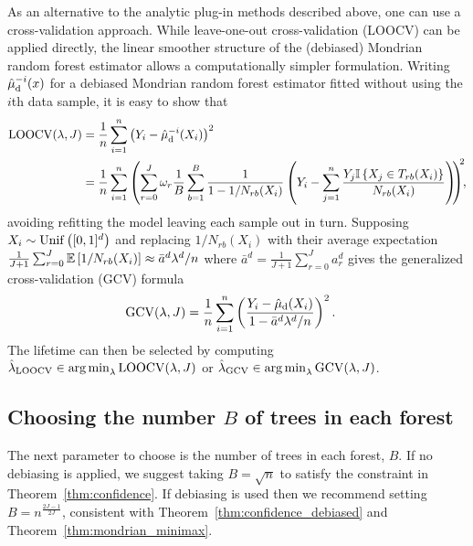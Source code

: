 As an alternative to the analytic plug-in methods described above,
one can use a cross-validation approach.
While leave-one-out cross-validation (LOOCV) can be applied directly,
the linear smoother structure of the (debiased) Mondrian random forest
estimator allows a computationally simpler formulation.
Writing $\hat\mu_{\mathrm{d}}^{-i}(x)$ for a debiased Mondrian random
forest estimator fitted without using the $i$th data sample,
it is easy to show that
%
\begin{align*}
  \operatorname{LOOCV}(\lambda, J)
  &=
  \frac{1}{n}
  \sum_{i=1}^{n}
  \left( Y_i - \hat\mu_{\mathrm{d}}^{-i}(X_i) \right)^2 \\
  &=
  \frac{1}{n}
  \sum_{i=1}^{n}
  \left(
    \sum_{r=0}^{J}
    \omega_r
    \frac{1}{B}
    \sum_{b=1}^{B}
    \frac{1}{1 - 1/N_{r b}(X_i)}
    \left( Y_i -
      \sum_{j=1}^{n}
      \frac{ Y_j \mathbb{I} \left\{ X_j \in T_{r b}(X_i) \right\}}
      {N_{r b}(X_i)}
    \right)
    \hspace*{-1mm}
  \right)^{\hspace*{-1mm}2}
  \hspace*{-1.2mm},
\end{align*}
%
avoiding refitting the model leaving each sample out in turn.
Supposing $X_i \sim \operatorname{Unif}\big([0,1]^d\big)$ and
replacing $1/N_{r b}(X_i)$ with their average expectation
$ \frac{1}{J+1}
\sum_{r=0}^{J}
\mathbb{E} \left[ 1/N_{r b}(X_i) \right]
\approx \bar a^d \lambda^d / n$
where
$\bar a^d = \frac{1}{J+1} \sum_{r=0}^{J} a_r^d$
gives the generalized cross-validation (GCV) formula
%
\begin{align}
  \label{eq:gcv}
  \operatorname{GCV}(\lambda, J)
  &=
  \frac{1}{n}
  \sum_{i=1}^{n}
  \left(
    \frac{Y_i - \hat\mu_{\mathrm{d}}(X_i)}
    {1 - \bar a^d \lambda^d / n}
  \right)^2.
\end{align}
%
The lifetime can then be selected by computing
$\hat\lambda_{\operatorname{LOOCV}} \in \operatorname*{arg\,min}_\lambda \operatorname{LOOCV}(\lambda, J)$
or
$\hat\lambda_{\operatorname{GCV}} \in \operatorname*{arg\,min}_\lambda \operatorname{GCV}(\lambda, J)$.

\subsection{Choosing the number \texorpdfstring{$B$}{B} of trees
in each forest}%

The next parameter to choose is the number of trees in each forest, $B$.
If no debiasing is applied, we suggest taking
$B = \sqrt{n}$ to satisfy the constraint in Theorem~\ref{thm:confidence}.
If debiasing is used then we recommend setting
$B = n^{\frac{2J-1}{2J}}$,
consistent with Theorem~\ref{thm:confidence_debiased}
and Theorem~\ref{thm:mondrian_minimax}.

